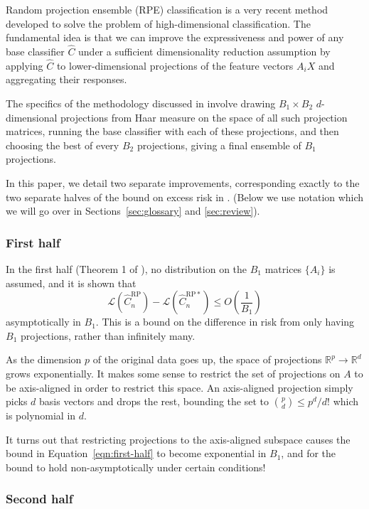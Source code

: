 \documentclass[ejs,preprint]{imsart}
\newcommand\crpnhat{\hat{C}_{n}^{\mathrm{RP}}}
\newcommand\crpnhatstar{\hat{C}_{n}^{\mathrm{RP*}}}
\newcommand\risk{\mathcal{L}}
\begin{document}
Random projection ensemble (RPE) classification is a very recent method developed to solve the problem of high-dimensional classification.
The fundamental idea is that we can improve the expressiveness and power of any base classifier $\hat C$ under a sufficient dimensionality reduction assumption by applying $\hat C$ to lower-dimensional projections of the feature vectors $A_i X$ and aggregating their responses.

The specifics of the methodology discussed in \cite{CS15} involve drawing $B_{1}\times B_{2}$ $d$-dimensional projections from Haar measure on the space of all such projection matrices, running the base classifier with each of these projections, and then choosing the best of every $B_{2}$ projections, giving a final ensemble of $B_{1}$ projections.

In this paper, we detail two separate improvements, corresponding exactly to the two separate halves of the bound on excess risk in \cite{CS15}. (Below we use notation which we will go over in Sections~\ref{sec:glossary} and \ref{sec:review}).

\subsubsection{First half}

In the first half (Theorem 1 of \cite{CS15}), no distribution on the $B_1$ matrices $\{A_i\}$ is assumed, and it is shown that
\begin{equation}
\risk(\crpnhat) - \risk(\crpnhatstar) \leq O\left(\frac{1}{B_1}\right)
\label{eqn:first-half}
\end{equation}
asymptotically in $B_1$. This is a bound on the difference in risk from only having $B_1$ projections, rather than infinitely many.

As the dimension $p$ of the original data goes up, the space of projections $\mathbb{R}^p\to\mathbb{R}^d$ grows exponentially. It makes some sense to restrict the set of projections on $A$ to be axis-aligned in order to restrict this space. An axis-aligned projection simply picks $d$ basis vectors and drops the rest, bounding the set to $\binom{p}{d}\leq p^{d}/d!$ which is polynomial in $d$.

It turns out that restricting projections to the axis-aligned subspace causes the bound in Equation~\ref{eqn:first-half} to become exponential in $B_1$, and for the bound to hold non-asymptotically under certain conditions!

\subsubsection{Second half}
\end{document}
